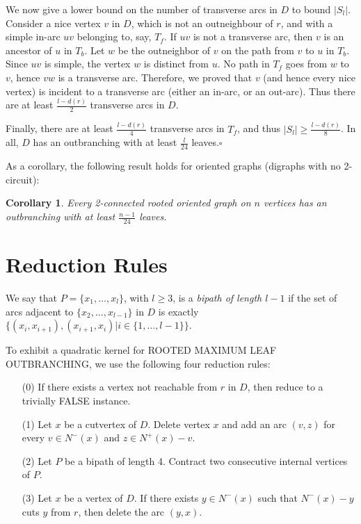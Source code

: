 \documentclass{article}
\newtheorem{coro}{Corollary}
\def\RMOD{R{\footnotesize{OOTED}} M{\footnotesize{AXIMUM}} L{\footnotesize{EAF}} O{\footnotesize{UTBRANCHING}}, }
\begin{document}
We now give a lower bound on the number of transverse arcs in $D$ to
bound $|S_l|$. Consider
a nice vertex $v$ in $D$, which is not an outneighbour of $r$, and with a simple in-arc $uv$ belonging to, say,
$T_f$. If $uv$ is not
a transverse arc, then $v$ is an ancestor of $u$ in $T_b$. Let $w$ be
the outneighbor of
$v$ on the path from $v$ to $u$ in $T_b$. Since $uv$ is simple, the
vertex $w$ is distinct
from $u$. No path in $T_f$ goes from $w$ to $v$, hence $vw$ is a
transverse arc. Therefore,
we proved that $v$ (and hence every nice vertex) is incident to a
transverse arc (either
an in-arc, or an out-arc). Thus there are at least $\frac{l-d(r)}{2}$
transverse arcs in $D$.

Finally, there are at least $\frac{l-d(r)}{4}$ transverse arcs in $T_f$, and thus
$|S_l|\ge \frac{l-d(r)}{8}$. In all,
$D$ has an outbranching with at least $\frac{l}{24}$ leaves.$\square$











\vspace{12pt}



As a corollary, the following result holds for oriented graphs (digraphs with no 2-circuit):
\begin{coro}
Every 2-connected rooted oriented graph on $n$ vertices has an outbranching with at least $\frac{n-1}{24}$ leaves.
\end{coro}





\section{Reduction Rules}\label{srules}
 We say that $P=\{x_1,\dots,x_l\}$, with $l\ge 3$, is a \emph{bipath of length $l-1$} if the set of arcs adjacent to $\{x_2,\dots,x_{l-1}\}$ in $D$ is exactly $\{(x_i,x_{i+1}),(x_{i+1},x_i) |i\in\{1,\dots,l-1\}\}$.

To exhibit a quadratic kernel for \RMOD we use the following four reduction rules:
\begin{itemize}
\item[(0)] If there exists a vertex not reachable from $r$ in $D$, then reduce to a trivially FALSE instance. 
\item[(1)] Let $x$ be a cutvertex of $D$. Delete vertex $x$ and add an arc $(v,z)$ for every $v\in N^-(x)$ and $z\in N^+(x)-v$.
\item[(2)] Let $P$ be a bipath of length 4. Contract two consecutive internal vertices of $P$. 
\item[(3)] Let $x$ be a vertex of $D$. If there exists $y\in N^-(x)$ such that $N^-(x)-y$ cuts $y$ from $r$, then delete the arc $(y,x)$.
\end{itemize}
\end{document}
